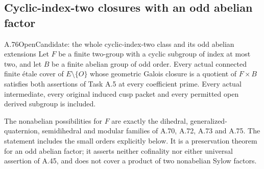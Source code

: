 \subsection{Cyclic-index-two closures with an odd abelian factor}

\begin{statement}{A.76}{Open}{Candidate: the whole cyclic-index-two class and its odd abelian extensions}
Let \(F\) be a finite two-group with a cyclic subgroup of
index at most two, and let \(B\) be a finite abelian group
of odd order. Every actual connected finite \'{e}tale cover
of \(E\setminus\{O\}\) whose geometric Galois closure is
a quotient of \(F\times B\) satisfies both assertions
of Task A.5 at every coefficient prime. Every actual
intermediate, every original induced cusp packet and every
permitted open derived subgroup is included.

The nonabelian possibilities for \(F\) are exactly the
dihedral, generalized-quaternion, semidihedral and modular
families of A.70, A.72, A.73 and A.75. The statement
includes the small orders explicitly below. It is a
preservation theorem for an odd abelian factor; it asserts
neither cofinality nor either universal assertion of A.45,
and does not cover a product of two nonabelian Sylow factors.
\end{statement}

